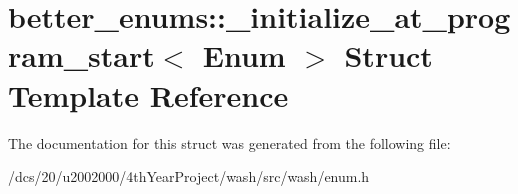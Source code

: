 \hypertarget{structbetter__enums_1_1__initialize__at__program__start}{}\section{better\+\_\+enums\+:\+:\+\_\+initialize\+\_\+at\+\_\+program\+\_\+start$<$ Enum $>$ Struct Template Reference}
\label{structbetter__enums_1_1__initialize__at__program__start}


The documentation for this struct was generated from the following file\+:\begin{DoxyCompactItemize}
\item 
/dcs/20/u2002000/4th\+Year\+Project/wash/src/wash/enum.\+h\end{DoxyCompactItemize}
